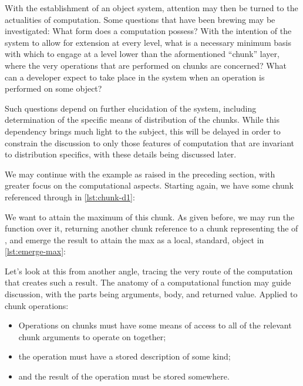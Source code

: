 With the establishment of an object system, attention may then be turned
to the actualities of computation. Some questions that have been brewing
may be investigated: What form does a computation possess? With the
intention of the system to allow for extension at every level, what is a
necessary minimum basis with which to engage at a level lower than the
aformentioned ``chunk'' layer, where the very operations that are
performed on chunks are concerned? What can a developer expect to take
place in the system when an operation is performed on some object?

Such questions depend on further elucidation of the system, including
determination of the specific means of distribution of the chunks. While
this dependency brings much light to the subject, this will be delayed
in order to constrain the discussion to only those features of
computation that are invariant to distribution specifics, with these
details being discussed later.

We may continue with the  example as raised in the preceding
section, with greater focus on the computational aspects. Starting
again, we have some chunk referenced through  in \cref{lst:chunk-d1}:


We want to attain the maximum of this chunk. As given before, we may run
the  function over it, returning another chunk reference to
a chunk representing the  of , and emerge the
result to attain the max as a local, standard, object in \cref{lst:emerge-max}:


Let's look at this from another angle, tracing the very route of the
computation that creates such a result. The anatomy of a computational
function may guide discussion, with the parts being arguments, body, and
returned value. Applied to chunk operations:

\begin{itemize}
    \item
          Operations on chunks must have some means of access to all of the
          relevant chunk arguments to operate on together;
    \item
          the operation must have a stored description of some kind;
    \item
          and the result of the operation must be stored somewhere.
\end{itemize}

